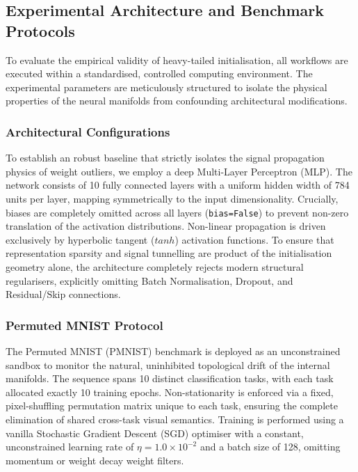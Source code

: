 \documentclass[10pt,a4paper]{article}
\begin{document}
	\subsection{Experimental Architecture and Benchmark Protocols}
	
	To evaluate the empirical validity of heavy-tailed initialisation, all workflows are executed within a standardised, controlled computing environment. The experimental parameters are meticulously structured to isolate the physical properties of the neural manifolds from confounding architectural modifications.
	
	\subsubsection{Architectural Configurations}
	To establish an robust baseline that strictly isolates the signal propagation physics of weight outliers, we employ a deep Multi-Layer Perceptron (MLP). The network consists of 10 fully connected layers with a uniform hidden width of 784 units per layer, mapping symmetrically to the input dimensionality. Crucially, biases are completely omitted across all layers (\texttt{bias=False}) to prevent non-zero translation of the activation distributions. Non-linear propagation is driven exclusively by hyperbolic tangent ($tanh$) activation functions. To ensure that representation sparsity and signal tunnelling are product of the initialisation geometry alone, the architecture completely rejects modern structural regularisers, explicitly omitting Batch Normalisation, Dropout, and Residual/Skip connections.
	
	\subsubsection{Permuted MNIST Protocol}
	The Permuted MNIST (PMNIST) benchmark is deployed as an unconstrained sandbox to monitor the natural, uninhibited topological drift of the internal manifolds. The sequence spans 10 distinct classification tasks, with each task allocated exactly 10 training epochs. Non-stationarity is enforced via a fixed, pixel-shuffling permutation matrix unique to each task, ensuring the complete elimination of shared cross-task visual semantics. Training is performed using a vanilla Stochastic Gradient Descent (SGD) optimiser with a constant, unconstrained learning rate of $\eta = 1.0 \times 10^{-2}$ and a batch size of 128, omitting momentum or weight decay weight filters.
	
\end{document}
